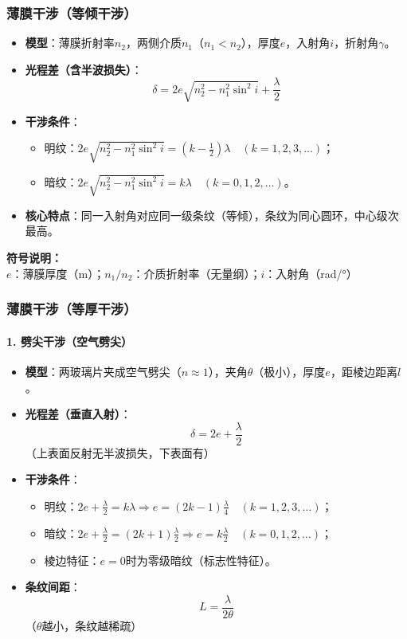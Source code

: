 \subsubsection{薄膜干涉（等倾干涉）}
\begin{itemize}
    \item \textbf{模型}：薄膜折射率$n_2$，两侧介质$n_1$（$n_1 < n_2$），厚度$e$，入射角$i$，折射角$\gamma$。
    \item \textbf{光程差（含半波损失）}：
          \[
          \delta = 2e\sqrt{n_2^2 - n_1^2\sin^2 i} + \frac{\lambda}{2}
          \]
    \item \textbf{干涉条件}：
          \begin{itemize}
              \item 明纹：$2e\sqrt{n_2^2 - n_1^2\sin^2 i} = \left(k - \frac{1}{2}\right)\lambda \quad (k=1,2,3,\dots)$；
              \item 暗纹：$2e\sqrt{n_2^2 - n_1^2\sin^2 i} = k\lambda \quad (k=0,1,2,\dots)$。
          \end{itemize}
    \item \textbf{核心特点}：同一入射角对应同一级条纹（等倾），条纹为同心圆环，中心级次最高。
\end{itemize}

\textbf{符号说明：} \\
$e$：薄膜厚度（m）；\quad $n_1/n_2$：介质折射率（无量纲）；\quad $i$：入射角（rad/°）
\vspace{0.5em}

\subsubsection{薄膜干涉（等厚干涉）}
\paragraph{1. 劈尖干涉（空气劈尖）}
\begin{itemize}
    \item \textbf{模型}：两玻璃片夹成空气劈尖（$n\approx1$），夹角$\theta$（极小），厚度$e$，距棱边距离$l$。
    \item \textbf{光程差（垂直入射）}：
          \[
          \delta = 2e + \frac{\lambda}{2}
          \]（上表面反射无半波损失，下表面有）
    \item \textbf{干涉条件}：
          \begin{itemize}
              \item 明纹：$2e + \frac{\lambda}{2} = k\lambda \Rightarrow e = (2k-1)\frac{\lambda}{4} \quad (k=1,2,3,\dots)$；
              \item 暗纹：$2e + \frac{\lambda}{2} = (2k+1)\frac{\lambda}{2} \Rightarrow e = k\frac{\lambda}{2} \quad (k=0,1,2,\dots)$；
              \item 棱边特征：$e=0$时为零级暗纹（标志性特征）。
          \end{itemize}
    \item \textbf{条纹间距}：
          \[
          L = \frac{\lambda}{2\theta}
          \]（$\theta$越小，条纹越稀疏）
\end{itemize}

